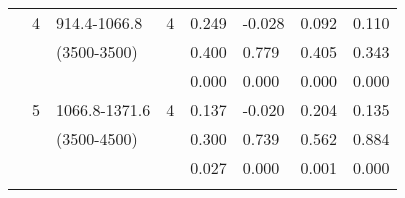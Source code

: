 \begin{table}[p]
\begin{tabular}{cclcllll}
                                                               & 4                                                              &  914.4-1066.8                                                        & 4                                                                     &  0.249                                      & -0.028                                          & 0.092                                               & 0.110  \\ 
                                                               &                                                                 & (3500-3500)                                                           &                                                                        &  0.400                                      & 0.779                                           & 0.405                                               & 0.343  \\ 
                                                               &                                                                 &                                                                                &                                                                        & 0.000                                       & 0.000                                           & 0.000                                               & 0.000  \\ \cline{5-8}\noalign{\smallskip}
                                                               & 5                                                              & 1066.8-1371.6                                                       & 4                                                                     & 0.137                                       & -0.020                                          & 0.204                                               & 0.135  \\ 
                                                               &                                                                 & (3500-4500)                                                           &                                                                        & 0.300                                       & 0.739                                           & 0.562                                               & 0.884  \\ 
                                                               &                                                                 &                                                                                &                                                                        & 0.027                                       & 0.000                                           & 0.001                                               & 0.000  \\ \cline{5-8}\noalign{\smallskip}

\end{tabular}
\end{table}
